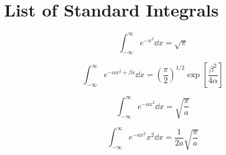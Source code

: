 \label{appendix1.Integrals}

\ifpdf
\graphicspath{{Appendix1/figs/}}
\else
\graphicspath{{Appendix1/figs/}}
\fi

\section{List of Standard Integrals}
\begin{equation}
\int_{-\infty}^{\infty} e^{-x^2} \dd{x} = \sqrt{\pi} 
\label{appendix1.eqn1}
\end{equation}

\begin{equation}
\int_{-\infty}^{\infty} e^{-\alpha x^2 + \beta x} \dd{x} = \left(\frac{\pi}{2}\right)^{1/2} \exp\left[\frac{\beta^2}{4\alpha}\right]
\label{appendix1.eqn2}
\end{equation}

\begin{equation}
\int_{-\infty}^{\infty} e^{-ax^2} \dd{x} =  \sqrt{\frac{\pi}{a}} 
\label{appendix1.eqn3}
\end{equation}

\begin{equation}
\int_{-\infty}^{\infty} e^{-ax^2} x^2 \dd{x} = \frac{1}{2 a} \sqrt{\frac{\pi}{a}} 
\label{appendix1.eqn4}
\end{equation}

